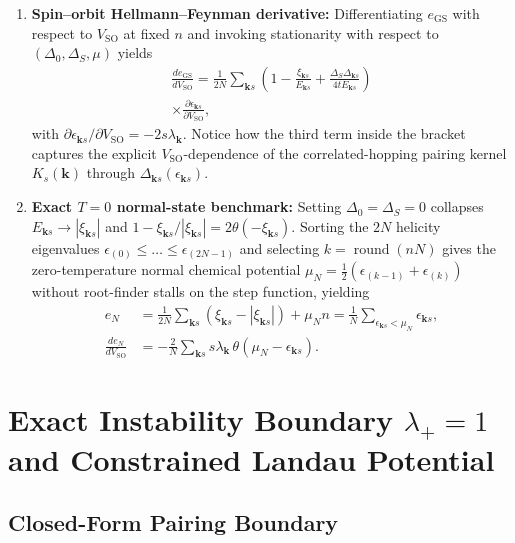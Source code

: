\documentclass[aps,prb,twocolumn,superscriptaddress,longbibliography,floatfix]{revtex4-2}
\newcommand{\SO}{V_{\mathrm{SO}}}
\newcommand{\ks}{\mathbf{k}s}
\begin{document}
\begin{enumerate}
\item \textbf{Spin--orbit Hellmann--Feynman derivative:} Differentiating $e_{\mathrm{GS}}$ with respect to $\SO$ at fixed $n$ and invoking stationarity with respect to $(\Delta_0,\Delta_S,\mu)$ yields
\begin{multline}
\frac{de_{\mathrm{GS}}}{d\SO} = \frac{1}{2N}\sum_{\ks}\left(1 - \frac{\xi_{\ks}}{E_{\ks}} + \frac{\Delta_S\Delta_{\ks}}{4t E_{\ks}}\right) \\
\times \frac{\partial\epsilon_{\ks}}{\partial\SO},
\label{eq:de_dVso}
\end{multline}
with $\partial\epsilon_{\ks}/\partial\SO = -2s\lambda_{\mathbf{k}}$. Notice how the third term inside the bracket captures the explicit $\SO$-dependence of the correlated-hopping pairing kernel $K_s(\mathbf{k})$ through $\Delta_{\ks}(\epsilon_{\ks})$.

\item \textbf{Exact $T=0$ normal-state benchmark:} Setting $\Delta_0=\Delta_S=0$ collapses $E_{\ks}\to|\xi_{\ks}|$ and $1 - \xi_{\ks}/|\xi_{\ks}| = 2\theta(-\xi_{\ks})$. Sorting the $2N$ helicity eigenvalues $\epsilon_{(0)}\le\dots\le\epsilon_{(2N-1)}$ and selecting $k=\operatorname{round}(nN)$ gives the zero-temperature normal chemical potential $\mu_N = \tfrac{1}{2}(\epsilon_{(k-1)}+\epsilon_{(k)})$ without root-finder stalls on the step function, yielding
\begin{align}
e_N &= \frac{1}{2N}\sum_{\ks}(\xi_{\ks}-|\xi_{\ks}|) + \mu_N n = \frac{1}{N}\sum_{\epsilon_{\ks}<\mu_N}\epsilon_{\ks}, \nonumber\\
\frac{de_N}{d\SO} &= -\frac{2}{N}\sum_{\ks} s\lambda_{\mathbf{k}}\,\theta(\mu_N - \epsilon_{\ks}).
\label{eq:eN_exact}
\end{align}
\end{enumerate}

\section{Exact Instability Boundary \texorpdfstring{$\lambda_+=1$}{lambda+=1} and Constrained Landau Potential}
\label{sec:lambda_landau}

\subsection{Closed-Form Pairing Boundary}
\end{document}
